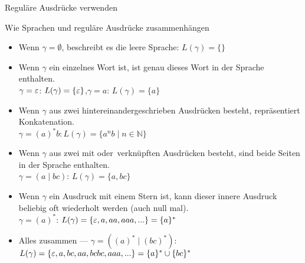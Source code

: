 \begin{frame}{Reguläre Ausdrücke verwenden}
    \begin{exampleblock}{Wie Sprachen und reguläre Ausdrücke zusammenhängen}
        \footnotesize
        \begin{itemize}[<+- | alert@+>]
            \item Wenn $\gamma = \emptyset$, beschreibt es die leere Sprache: $L(\gamma) = \{\}$
            \item Wenn $\gamma$ ein einzelnes Wort ist, ist genau dieses Wort in der Sprache enthalten.\\
                  $\gamma = \varepsilon$: $L(\gamma)=\{\varepsilon\}$,\quad$\gamma = a$: $L(\gamma)=\{a\}$
            \item Wenn $\gamma$ aus zwei hintereinandergeschrieben Ausdrücken besteht, repräsentiert Konkatenation.\\
                  $\gamma = (a)^*b: L(\gamma)=\{a^nb \mid n \in \mathbb{N}\}$
            \item Wenn $\gamma$ aus zwei mit \glqq oder\grqq\ verknüpften Ausdrücken besteht, sind beide Seiten in der Sprache enthalten.\\
                  $\gamma = (a \mid bc)$: $L(\gamma)=\{a, bc\}$
            \item Wenn $\gamma$ ein Ausdruck mit einem Stern ist, kann dieser innere Ausdruck beliebig oft wiederholt werden (auch null mal).\\
                  $\gamma = (a)^*$: $L(\gamma)=\{\varepsilon, a, aa, aaa, ...\}=\{a\}^*$
            \item Alles zusammen --- $\gamma = ((a)^* \mid (bc)^*)$: $L(\gamma)=\{\varepsilon, a, bc, aa, bcbc, aaa, ...\} = \{a\}^* \cup \{bc\}^*$
        \end{itemize}
    \end{exampleblock}
\end{frame}


